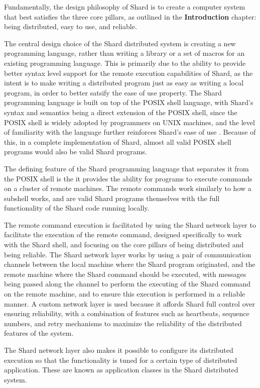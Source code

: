 \documentclass[twoside]{report}
\begin{document}
Fundamentally, the design philosophy of Shard is to create a computer system that best satisfies the three core pillars, as outlined in the \textbf{Introduction} chapter: being distributed, easy to use, and reliable.

The central design choice of the Shard distributed system is creating a new programming language, rather than writing a library or a set of macros for an existing programming language.
This is primarily due to the ability to provide better syntax level support for the remote execution capabilities of Shard, as the intent is to make writing a distributed program just as easy as writing a local program, in order to better satsify the ease of use property.
The Shard programming language is built on top of the POSIX shell language, with Shard's syntax and semantics being a direct extension of the POSIX shell, since the POSIX shell is widely adopted by programmers on UNIX machines, and the level of familiarity with the language further reinforces Shard's ease of use \cite{posix2017}.
Because of this, in a complete implementation of Shard, almost all valid POSIX shell programs would also be valid Shard programs.

The defining feature of the Shard programming language that separates it from the POSIX shell is the it provides the ability for programs to execute commands on a cluster of remote machines.
The remote commands work similarly to how a subshell works, and are valid Shard programs themselves with the full functionality of the Shard code running locally.

The remote command execution is facilitated by using the Shard network layer to facilitate the execution of the remote command, designed specifically to work with the Shard shell, and focusing on the core pillars of being distributed and being reliable.
The Shard network layer works by using a pair of communication channels between the local machine where the Shard program originated, and the remote machine where the Shard command should be executed, with messages being passed along the channel to perform the executing of the Shard command on the remote machine, and to ensure this execution is performed in a reliable manner.
A custom network layer is used because it affords Shard full control over ensuring reliability, with a combination of features such as heartbeats, sequence numbers, and retry mechanisms to maximize the reliability of the distributed features of the system.

The Shard network layer also makes it possible to configure its distributed execution so that the functionality is tuned for a certain type of distributed application.
These are known as application classes in the Shard distributed system.
\end{document}
